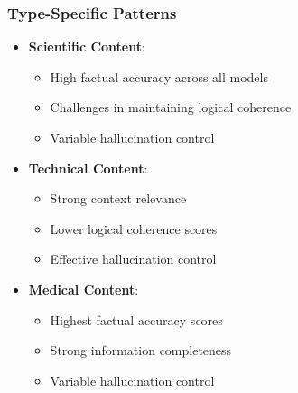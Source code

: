 \subsubsection{Type-Specific Patterns}
\begin{itemize}
    \item \textbf{Scientific Content}:
    \begin{itemize}
        \item High factual accuracy across all models
        \item Challenges in maintaining logical coherence
        \item Variable hallucination control
    \end{itemize}
    
    \item \textbf{Technical Content}:
    \begin{itemize}
        \item Strong context relevance
        \item Lower logical coherence scores
        \item Effective hallucination control
    \end{itemize}
    
    \item \textbf{Medical Content}:
    \begin{itemize}
        \item Highest factual accuracy scores
        \item Strong information completeness
        \item Variable hallucination control
    \end{itemize}
\end{itemize}
